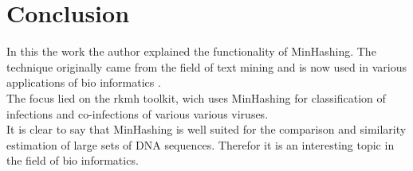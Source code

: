 \section{Conclusion}

In this the work the author explained the functionality of MinHashing. The technique originally came from the field of text mining and is now used in various applications of bio informatics \cite{rkmh, mash, sourmash}.\\

The focus lied on the rkmh toolkit, wich uses MinHashing for classification of infections and co-infections of various various viruses.\\

It is clear to say that MinHashing is well suited for the comparison and similarity estimation of large sets of DNA sequences. Therefor it is an interesting topic in the field of bio informatics.\\